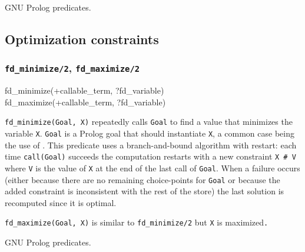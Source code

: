 \Portability

GNU Prolog predicates.

\subsection{Optimization constraints}

\subsubsection{\texttt{fd\_minimize/2},
               \texttt{fd\_maximize/2}}

\begin{TemplatesOneCol}
fd\_minimize(+callable\_term, ?fd\_variable)\\
fd\_maximize(+callable\_term, ?fd\_variable)

\end{TemplatesOneCol}

\Description

\texttt{fd\_minimize(Goal, X)} repeatedly calls \texttt{Goal} to find a
value that minimizes the variable \texttt{X}. \texttt{Goal} is a Prolog goal
that should instantiate \texttt{X}, a common case being the use of
 . This predicate uses a
branch-and-bound algorithm with restart: each time \texttt{call(Goal)}
succeeds the computation restarts with a new constraint \texttt{X \#{\lt} V}
where \texttt{V} is the value of \texttt{X} at the end of the last call of
\texttt{Goal}. When a failure occurs (either because there are no remaining
choice-points for \texttt{Goal} or because the added constraint is
inconsistent with the rest of the store) the last solution is recomputed
since it is optimal.

\texttt{fd\_maximize(Goal, X)} is similar to \texttt{fd\_minimize/2} but
\texttt{X} is maximized\texttt{.}

\begin{PlErrors}





\end{PlErrors}

\Portability

GNU Prolog predicates.
